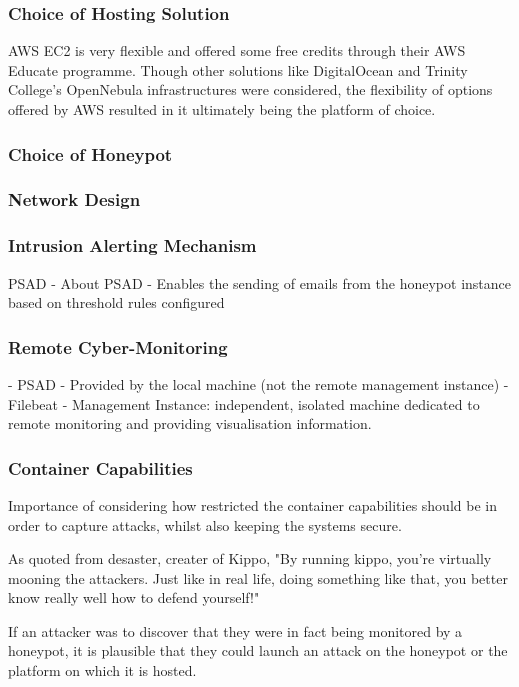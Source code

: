 		\subsubsection{Choice of Hosting Solution}
	
		AWS EC2 is very flexible and offered some free credits through their AWS Educate programme. Though other solutions like DigitalOcean and Trinity College's OpenNebula infrastructures were considered, the flexibility of options offered by AWS resulted in it ultimately being the platform of choice.
		
		\subsubsection{Choice of Honeypot}
				
		\subsubsection{Network Design}
		
		\subsubsection{Intrusion Alerting Mechanism}
		PSAD
		- About PSAD
		- Enables the sending of emails from the honeypot instance based on threshold rules configured
		\subsubsection{Remote Cyber-Monitoring}
		- PSAD
			- Provided by the local machine (not the remote management instance)
		- Filebeat
		- Management Instance: independent, isolated machine dedicated to remote monitoring and providing visualisation information.

		\subsubsection{Container Capabilities}
		Importance of considering how restricted the container capabilities should be in order to capture attacks, whilst also keeping the systems secure.
		
		As quoted from desaster, creater of Kippo, "By running kippo, you're virtually mooning the attackers. Just like in real life, doing something like that, you better know really well how to defend yourself!"
		
		If an attacker was to discover that they were in fact being monitored by a honeypot, it is plausible that they could launch an attack on the honeypot or the platform on which it is hosted.
		

